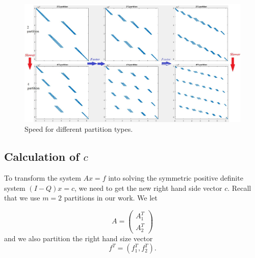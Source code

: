 \documentclass[a4paper,12pt]{article}
\begin{document}
\begin{figure}[ht]
\begin{centering}
\includegraphics[width=6in]{Images/quality.jpg}
\end{centering}
\caption{Speed for different partition types.}
\label{quality}
\end{figure}




\subsection{Calculation of $c$}
To transform the system $Ax = f$ into solving the symmetric positive definite system $(I-Q)x = c$, we need to get the new right hand side vector $c$. Recall that we use $m=2$ partitions in our work. We let

 $$A = \begin{pmatrix} A_1^T \\ A_2^T \end{pmatrix}  $$ and we also partition the right hand size vector $$f^T = (f_1^T, f_2^T).$$
 
\end{document}

